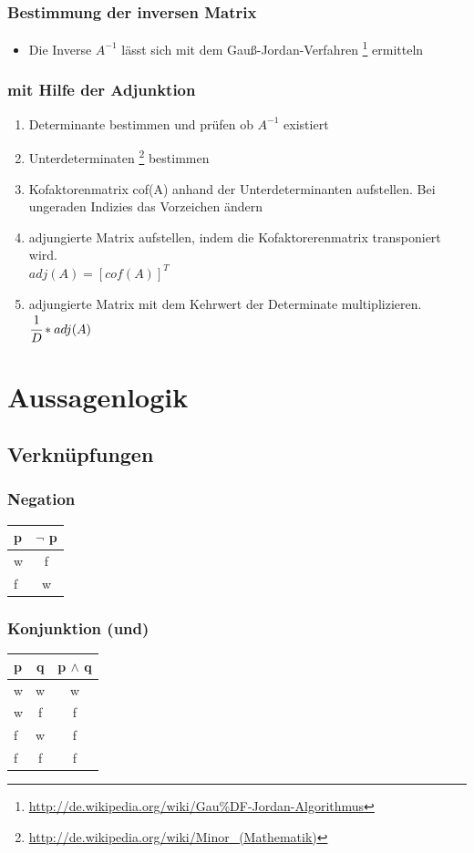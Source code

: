 \documentclass[a4paper,12pt]{scrartcl}
\begin{document}
\subsubsection{Bestimmung der inversen Matrix}
\begin{itemize}
\item Die Inverse $A^{-1}$ lässt sich mit dem Gauß-Jordan-Verfahren \footnote{\url{http://de.wikipedia.org/wiki/Gau\%DF-Jordan-Algorithmus}} ermitteln
\end{itemize}

\subsubsection{mit Hilfe der Adjunktion}
\begin{enumerate}
\item Determinante bestimmen und prüfen ob  $A^{-1}$ existiert
\item Unterdeterminaten \footnote{\url{http://de.wikipedia.org/wiki/Minor_(Mathematik)}} bestimmen
\item Kofaktorenmatrix cof(A) anhand der Unterdeterminanten aufstellen. Bei ungeraden Indizies das Vorzeichen ändern
\item adjungierte Matrix aufstellen, indem die Kofaktorerenmatrix transponiert wird. \\ $adj(A) = [cof(A)]^T$
\item adjungierte Matrix mit dem Kehrwert der Determinate multiplizieren. \\ $\cfrac{1}{D} * adj(A)$
\end{enumerate}

\section{Aussagenlogik}
\subsection{Verknüpfungen}

\subsubsection{Negation}
\begin{tabular}{l|c}
  p & $\neg$ p\\
  \hline
  w & f \\
  f & w \\
\end{tabular}

\subsubsection{Konjunktion (und)}
\begin{tabular}{lc|c}
  p & q & p $\land$ q\\
  \hline
  w & w & w \\
  w & f & f \\
  f & w & f \\
  f & f & f \\
\end{tabular}
\end{document}
